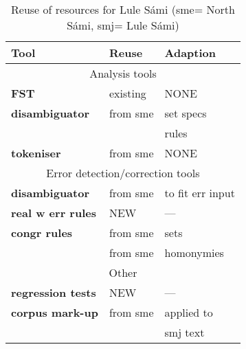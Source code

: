 \documentclass[free]{flammie}
\begin{document}
\begin{table}[h]
    \centering
    \begin{tabular}{lll}
         \textbf{Tool} & \textbf{Reuse}  & \textbf{Adaption}\\
         \toprule
         \multicolumn{3}{c}{Analysis tools} \\
         \midrule
         \textbf{FST} & existing &  NONE \\
         \textbf{disambiguator} & from sme &  set specs \\
          &  & rules \\
         \textbf{tokeniser} & from sme &  NONE \\
         \midrule
         \multicolumn{3}{c}{Error detection/correction tools} \\
         \midrule
         \textbf{disambiguator} & from sme  & to fit err input \\
         \textbf{real w err rules} & NEW & --- \\
         \textbf{congr rules} & from sme & sets  \\
          & from sme & homonymies \\
         \midrule
         \multicolumn{3}{c}{Other} \\
         \midrule
         \textbf{regression tests} & NEW & --- \\
         \textbf{corpus mark-up} & from sme & applied to \\
                                 &          & smj text \\
         \bottomrule
         \end{tabular}
    \caption{Reuse of resources for Lule Sámi (sme= North Sámi, smj= Lule Sámi)\label{reuse}}
\end{table}
\end{document}
